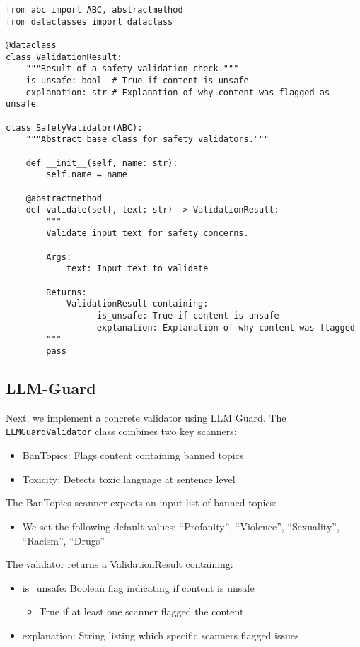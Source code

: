 \begin{verbatim}
from abc import ABC, abstractmethod
from dataclasses import dataclass

@dataclass
class ValidationResult:
    """Result of a safety validation check."""
    is_unsafe: bool  # True if content is unsafe
    explanation: str # Explanation of why content was flagged as unsafe

class SafetyValidator(ABC):
    """Abstract base class for safety validators."""
    
    def __init__(self, name: str):
        self.name = name
    
    @abstractmethod
    def validate(self, text: str) -> ValidationResult:
        """
        Validate input text for safety concerns.
        
        Args:
            text: Input text to validate
            
        Returns:
            ValidationResult containing:
                - is_unsafe: True if content is unsafe
                - explanation: Explanation of why content was flagged
        """
        pass
\end{verbatim}

\subsection{LLM-Guard}

Next, we implement a concrete validator using LLM Guard. The \texttt{LLMGuardValidator} class combines two key scanners:
\begin{itemize}
\item BanTopics: Flags content containing banned topics
\item Toxicity: Detects toxic language at sentence level
\end{itemize}

The BanTopics scanner expects an input list of banned topics:
\begin{itemize}
\item We set the following default values: ``Profanity'', ``Violence'', ``Sexuality'', ``Racism'', ``Drugs''
\end{itemize}

The validator returns a ValidationResult containing:
\begin{itemize}
\item is\_unsafe: Boolean flag indicating if content is unsafe
  \begin{itemize} 
  \item True if at least one scanner flagged the content
  \end{itemize}
\item explanation: String listing which specific scanners flagged issues
\end{itemize}

